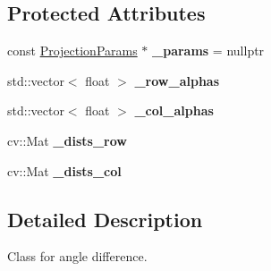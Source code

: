 \subsection*{Protected Attributes}
\begin{DoxyCompactItemize}
\item 
\mbox{\label{classdepth__clustering_1_1LineDistDiffPrecomputed_aeb0f0894cc1f1fcbd9d40813005432f3}} 
const \hyperlink{classdepth__clustering_1_1ProjectionParams}{Projection\+Params} $\ast$ {\bfseries \+\_\+params} = nullptr
\item 
\mbox{\label{classdepth__clustering_1_1LineDistDiffPrecomputed_a5694d6392f56f8659f048f6df7f0ba93}} 
std\+::vector$<$ float $>$ {\bfseries \+\_\+row\+\_\+alphas}
\item 
\mbox{\label{classdepth__clustering_1_1LineDistDiffPrecomputed_a0c9b6dc3de39f95b8a76061e94e85505}} 
std\+::vector$<$ float $>$ {\bfseries \+\_\+col\+\_\+alphas}
\item 
\mbox{\label{classdepth__clustering_1_1LineDistDiffPrecomputed_aa4f24cff932c5d498c01ec71179a5e89}} 
cv\+::\+Mat {\bfseries \+\_\+dists\+\_\+row}
\item 
\mbox{\label{classdepth__clustering_1_1LineDistDiffPrecomputed_ac0a7cd72ad073091beaefa1d6b3da4a1}} 
cv\+::\+Mat {\bfseries \+\_\+dists\+\_\+col}
\end{DoxyCompactItemize}


\subsection{Detailed Description}
Class for angle difference. 

